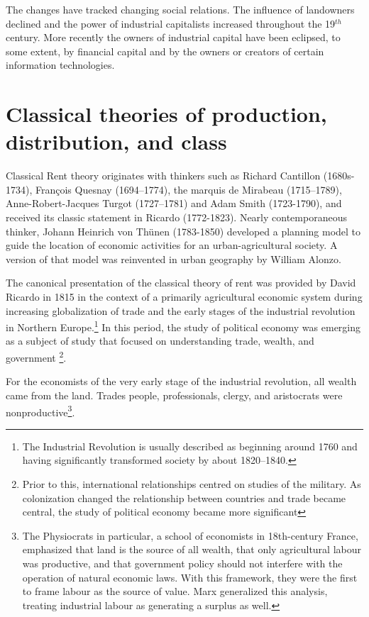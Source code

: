 The changes have tracked changing social relations. The influence of landowners declined and the power of  industrial capitalists increased throughout the 19$^{th}$ century. More recently the owners of industrial capital have been eclipsed, to some extent, by financial capital and by the owners or creators of certain information technologies.
 
\section{Classical theories of production, distribution, and class}
Classical Rent theory originates with  thinkers such as Richard Cantillon (1680s-1734), 
Fran\c{c}ois Quesnay (1694–1774), the marquis de Mirabeau (1715–1789), Anne-Robert-Jacques
Turgot (1727--1781) and 
Adam Smith (1723-1790), and received its classic statement
in Ricardo (1772-1823). Nearly contemporaneous thinker, 
Johann Heinrich von Th\"unen (1783-1850) developed a planning model to guide the location of economic activities for an urban-agricultural society. A version of that model was reinvented in urban geography by William Alonzo.

The canonical presentation of the classical theory of rent \cite{ricardoEssayInfluenceLow1815} was provided  by David Ricardo in 1815 in the context of a primarily agricultural economic system during increasing globalization of trade and  the early stages of the industrial revolution in Northern Europe.\footnote{The Industrial Revolution is usually described as beginning around 1760 and having significantly transformed society by about 1820–1840.} In this period, the study of \gls{political economy} was emerging as a subject of study that focused on understanding trade, wealth, and government \footnote{Prior to this, international relationships centred on studies of the military. As colonization changed the relationship between countries and trade became central, the study of \gls{political economy} became more significant}. 

For the economists of the very early stage of the industrial revolution, %
all wealth came from the land. Trades people, professionals, clergy, and aristocrats were %
nonproductive\footnote{The Physiocrats in particular, a school of economists in 18th-century France, emphasized  that land is the source of all wealth, that only agricultural labour was productive, and that government policy should not interfere with the operation of natural economic laws. With this framework, they were the first to frame labour as the source of value. Marx generalized this analysis, treating industrial labour as generating a surplus as well.}.

